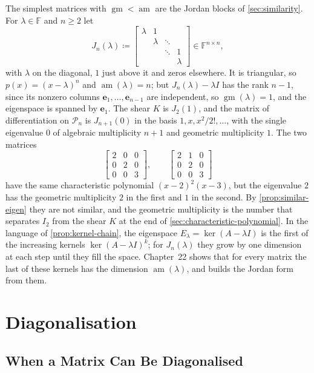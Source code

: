 The simplest matrices with $\operatorname{gm}<\operatorname{am}$ are the Jordan blocks of \cref{sec:similarity}. For $\lambda\in\mathbb F$ and $n\ge2$ let
\[
J_n(\lambda)\coloneqq\begin{bmatrix}\lambda&1&&\\&\lambda&\ddots&\\&&\ddots&1\\&&&\lambda\end{bmatrix}\in\mathbb F^{n\times n},
\]
with $\lambda$ on the diagonal, $1$ just above it and zeros elsewhere. It is triangular, so $p(x)=(x-\lambda)^n$ and $\operatorname{am}(\lambda)=n$; but $J_n(\lambda)-\lambda I$ has the rank $n-1$, since its nonzero columns $\mathbf e_1,\ldots,\mathbf e_{n-1}$ are independent, so $\operatorname{gm}(\lambda)=1$, and the eigenspace is spanned by $\mathbf e_1$. The shear $K$ is $J_2(1)$, and the matrix of differentiation on $\mathcal P_n$ is $J_{n+1}(0)$ in the basis $1,x,x^2/2!,\ldots$, with the single eigenvalue $0$ of algebraic multiplicity $n+1$ and geometric multiplicity $1$. The two matrices
\[
\begin{bmatrix}2&0&0\\0&2&0\\0&0&3\end{bmatrix},\qquad\begin{bmatrix}2&1&0\\0&2&0\\0&0&3\end{bmatrix}
\]
have the same characteristic polynomial $(x-2)^2(x-3)$, but the eigenvalue $2$ has the geometric multiplicity $2$ in the first and $1$ in the second. By \cref{prop:similar-eigen} they are not similar, and the geometric multiplicity is the number that separates $I_2$ from the shear $K$ at the end of \cref{sec:characteristic-polynomial}. In the language of \cref{prop:kernel-chain}, the eigenspace $E_\lambda=\ker(A-\lambda I)$ is the first of the increasing kernels $\ker(A-\lambda I)^k$; for $J_n(\lambda)$ they grow by one dimension at each step until they fill the space. Chapter~22 shows that for every matrix the last of these kernels has the dimension $\operatorname{am}(\lambda)$, and builds the Jordan form from them.

\section{Diagonalisation}
\label{sec:diagonalisation}

\subsection{When a Matrix Can Be Diagonalised}

